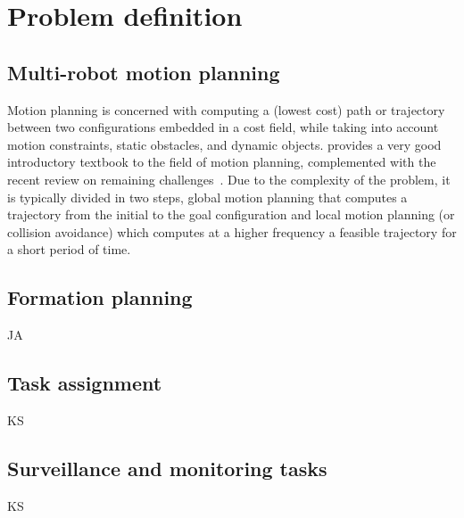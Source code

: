 
\section{Problem definition}\label{sec:2}

\subsection{Multi-robot motion planning}
Motion planning is concerned with computing a (lowest cost) path or trajectory between two configurations embedded in a cost field, while taking into account motion constraints, static obstacles, and dynamic objects.  \citet{lavalle06} provides a very good introductory textbook to the field of motion planning, complemented with the recent review on remaining challenges~\citep{LaValle:2011wc}. Due to the complexity of the problem, it is typically divided in two steps, global motion planning that computes a trajectory from the initial to the goal configuration and local motion planning (or collision avoidance) which computes at a higher frequency a feasible trajectory for a short period of time. 


\subsection{Formation planning}
JA

\subsection{Task assignment}
KS

\subsection{Surveillance and monitoring tasks}
KS


